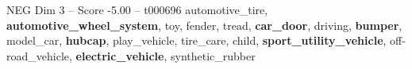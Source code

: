 \begin{textsample}{NEG Dim 3 – Score -5.00 – t000696}  \label{ex:f3_neg_024}
automotive\_tire, \textbf{automotive\_wheel\_system}, toy, fender, tread, \textbf{car\_door}, driving, \textbf{bumper}, model\_car, \textbf{hubcap}, play\_vehicle, tire\_care, child, \textbf{sport\_utility\_vehicle}, off-road\_vehicle, \textbf{electric\_vehicle}, synthetic\_rubber

\end{textsample}
